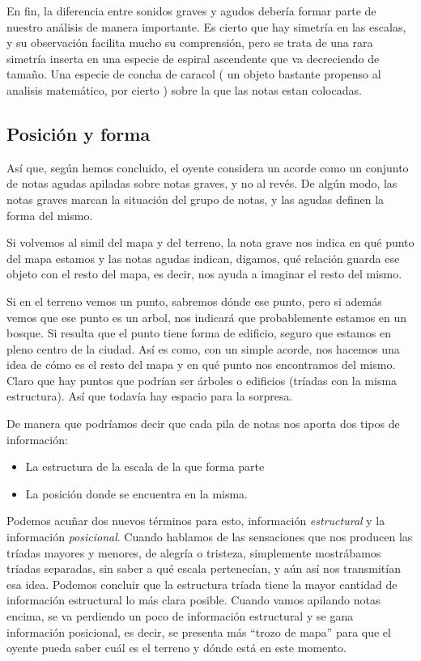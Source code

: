 \documentclass[]{article}
\providecommand{\tightlist}{%
  \setlength{
\itemsep}{0pt}\setlength{\parskip}{0pt}}
\begin{document}
En fin, la diferencia entre sonidos graves y agudos debería formar parte de nuestro análisis de manera importante. Es cierto que hay simetría en las escalas, y su observación facilita mucho su comprensión, pero se trata de una rara simetría inserta en una especie de espiral ascendente que va decreciendo de tamaño. Una especie de concha de caracol ( un objeto bastante propenso al analisis matemático, por cierto ) sobre la que las notas estan colocadas.

\subsection{Posición y forma}

Así que, según hemos concluido, el oyente considera un acorde como un conjunto de notas agudas apiladas sobre notas graves, y no al revés. De algún modo, las notas graves marcan la situación del grupo de notas, y las agudas definen la forma del mismo.

Si volvemos al simil del mapa y del terreno, la nota grave nos indica en qué punto del mapa estamos y las notas agudas indican, digamos, qué relación guarda ese objeto con el resto del mapa, es decir, nos ayuda a imaginar el resto del mismo.

Si en el terreno vemos un punto, sabremos dónde ese punto, pero si además vemos que ese punto es un arbol, nos indicará que probablemente estamos en un bosque. Si resulta que el punto tiene forma de edificio, seguro que estamos en pleno centro de la ciudad. Así es como, con un simple acorde, nos hacemos una idea de cómo es el resto del mapa y en qué punto nos encontramos del mismo. Claro que hay puntos que podrían ser árboles o edificios (tríadas con la misma estructura). Así que todavía hay espacio para la sorpresa.

De manera que podríamos decir que cada pila de notas nos aporta dos tipos de información:

\begin{itemize}   \tightlist   
  \item La estructura de la escala de la que forma parte   
  \item La posición donde se encuentra en la misma. 
\end{itemize}

Podemos acuñar dos nuevos términos para esto, información \emph{estructural} y la información \emph{posicional}. Cuando hablamos de las sensaciones que nos producen las tríadas mayores y menores, de alegría o tristeza, simplemente mostrábamos tríadas separadas, sin saber a qué escala pertenecían, y aún así nos transmitían esa idea. Podemos concluir que la estructura tríada tiene la mayor cantidad de información estructural lo más clara posible. Cuando vamos apilando notas encima, se va perdiendo un poco de información estructural y se gana información posicional, es decir, se presenta más ``trozo de mapa'' para que el oyente pueda saber cuál es el terreno y dónde está en este momento.
\end{document}
